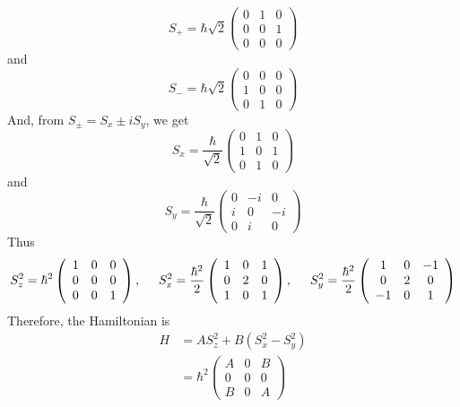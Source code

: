 \documentclass[12pt, letterpaper]{article}
\begin{document}
\begin{enumerate}
    \begin{equation}
        S_+=\hbar \sqrt{2}\left(\begin{array}{ccc}0&1&0\\0&0&1\\0&0&0\end{array}\right)
    \end{equation}
    and 
    \begin{equation}
        S_-=\hbar \sqrt{2}\left(\begin{array}{ccc}0&0&0\\1&0&0\\0&1&0\end{array}\right)
    \end{equation}
    And, from $S_{\pm}=S_x\pm iS_y$, we get
    \begin{equation}
        S_x=\frac{\hbar}{\sqrt{2}}\left(\begin{array}{ccc}0&1&0\\1&0&1\\0&1&0\end{array}\right)
    \end{equation}
    and 
    \begin{equation}
        S_y=\frac{\hbar}{\sqrt{2}}\left(\begin{array}{ccc}0&-i&0\\i&0&-i\\0&i&0\end{array}\right)
    \end{equation}
    Thus
    \begin{equation}
        S_z^2=\hbar^2\left(\begin{array}{ccc}1&0&0\\0&0&0\\0&0&1\end{array}\right),\hspace{0.5cm}S_x^2=\frac{\hbar^2}{2}\left(\begin{array}{ccc}1&0&1\\0&2&0\\1&0&1\end{array}\right),\hspace{0.5cm}S_y^2=\frac{\hbar^2}{2}\left(\begin{array}{ccc}1&0&-1\\0&2&0\\-1&0&1\end{array}\right)
    \end{equation}
    Therefore, the Hamiltonian is
    \begin{align}
        H&=AS_z^2+B(S_x^2-S_y^2)\\&=\hbar^2\left(\begin{array}{ccc}A&0&B\\0&0&0\\B&0&A\end{array}\right)
    \end{align}
    

\end{enumerate}
\end{document}
